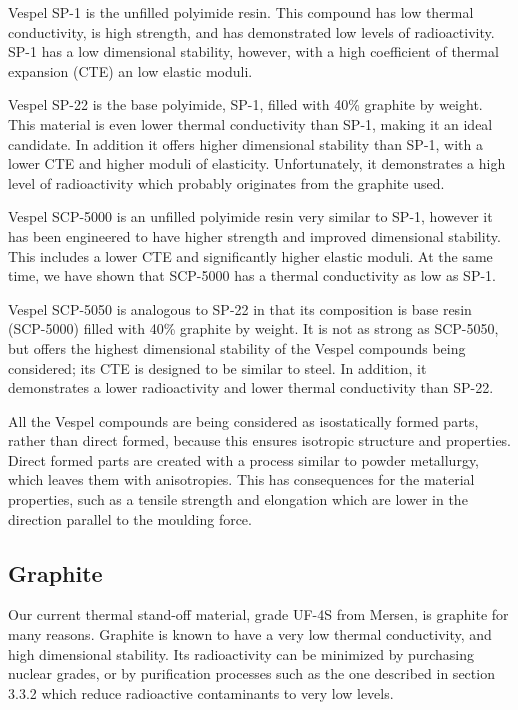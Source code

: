 \documentclass{report}
\begin{document}

Vespel SP-1 is the unfilled polyimide resin. This compound has low thermal conductivity, is high strength, and has demonstrated low levels of radioactivity. SP-1 has a low dimensional stability, however, with a high coefficient of thermal expansion (CTE) an low elastic moduli.

Vespel SP-22 is the base polyimide, SP-1, filled with 40\% graphite by weight. This material is even lower thermal conductivity than SP-1, making it an ideal candidate. In addition it offers higher dimensional stability than SP-1, with a lower CTE and higher moduli of elasticity. Unfortunately, it demonstrates a high level of radioactivity which probably originates from the graphite used.

Vespel SCP-5000 is an unfilled polyimide resin very similar to SP-1, however it has been engineered to have higher strength and improved dimensional stability. This includes a lower CTE and significantly higher elastic moduli. At the same time, we have shown that SCP-5000 has a thermal conductivity as low as SP-1.

Vespel SCP-5050 is analogous to SP-22 in that its composition is base resin (SCP-5000) filled with 40\% graphite by weight. It is not as strong as SCP-5050, but offers the highest dimensional stability of the Vespel compounds being considered; its CTE is designed to be similar to steel. In addition, it demonstrates a lower radioactivity and lower thermal conductivity than SP-22.

All the Vespel compounds are being considered as isostatically formed parts, rather than direct formed, because this ensures isotropic structure and properties. Direct formed parts are created with a process similar to powder metallurgy, which leaves them with anisotropies. This has consequences for the material properties, such as a tensile strength and elongation which are lower in the direction parallel to the moulding force.

\subsection{Graphite}

Our current thermal stand-off material, grade UF-4S from Mersen, is graphite for many reasons. Graphite is known to have a very low thermal conductivity, and high dimensional stability. Its radioactivity can be minimized by purchasing nuclear grades, or by purification processes such as the one described in section 3.3.2 which reduce radioactive contaminants to very low levels.
\end{document}

